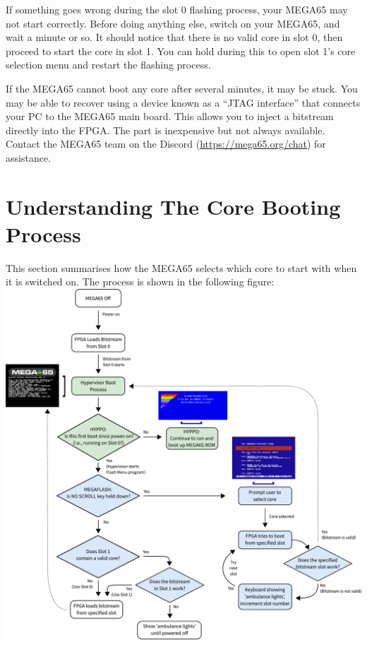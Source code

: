 If something goes wrong during the slot 0 flashing process, your MEGA65 may not start correctly. Before doing anything else, switch on your MEGA65, and wait a minute or so. It should notice that there is no valid core in slot 0, then proceed to start the core in slot 1. You can hold  during this to open slot 1's core selection menu and restart the flashing process.

If the MEGA65 cannot boot any core after several minutes, it may be stuck. You may be able to recover using a device known as a ``JTAG interface'' that connects your PC to the MEGA65 main board. This allows you to inject a bitstream directly into the FPGA. The part is inexpensive but not always available. Contact the MEGA65 team on the Discord (\url{https://mega65.org/chat}) for assistance.


\section{Understanding The Core Booting Process}
\nopagebreak
This section summarises how the MEGA65 selects which core to start with when it is switched on. The process is shown in the following figure:
\nopagebreak
\includegraphics[width=\linewidth]{images/illustrations/flashmenu-flowchart.pdf}

